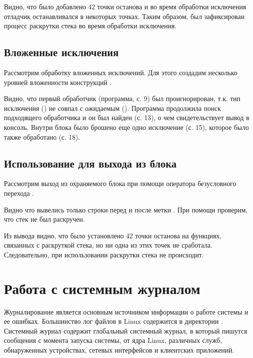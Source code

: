 
Видно, что было добавлено 42 точки останова и во время обработки исключения отладчик останавливался в некоторых точках. Таким образом, был зафиксирован процесс раскрутки стека во время обработки исключения.

\subsection{Вложенные исключения}

Рассмотрим обработку вложенных исключений. Для этого создадим несколько уровней вложенности конструкций .


Видно, что первый обработчик (программа, с. 9) был проигнорирован, т.к. тип исключения () не совпал с ожидаемым (). Программа продолжила поиск подходящего обработчика и он был найден (с. 13), о чем свидетельствует вывод в консоль. Внутри блока  было брошено еще одно исключение (с. 15), которое было также обработано (с. 18).

\subsection{Использование  для выхода из блока }

Рассмотрим выход из охраняемого блока  при помощи оператора безусловного перехода .


Видно что вывелись только строки перед  и после метки . При помощи  проверим, что стек не был раскручен.


Из вывода видно, что было установлено 42 точки останова на функциях, связанных с раскруткой стека, но ни одна из этих точек не сработала. Следовательно, при использовании  раскрутки стека не происходит.

\section{Работа с системным журналом}

Журналирование является основным источником информации о работе системы и ее ошибках. Большинство лог файлов в Linux содержится в директории . Системный журнал  содержит глобальный системный журнал, в который пишутся сообщения с момента запуска системы, от ядра Linux, различных служб, обнаруженных устройствах, сетевых интерфейсов и клиентских приложений.

